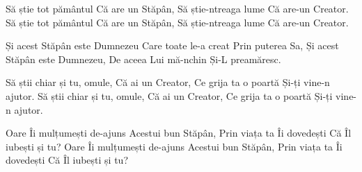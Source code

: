 \beginverse
Să știe tot pământul
Că are un Stăpân,
Să știe-ntreaga lume
Că are-un Creator.
Să știe tot pământul
Că are un Stăpân,
Să știe-ntreaga lume
Că are-un Creator.
\endverse

\beginchorus
Și acest Stăpân este Dumnezeu
Care toate le-a creat
Prin puterea Sa,
Și acest Stăpân este Dumnezeu,
De aceea Lui mă-nchin
Și-L preamăresc.
\endchorus

\beginverse
Să știi chiar și tu, omule,
Că ai un Creator,
Ce grija ta o poartă
Și-ți vine-n ajutor.
Să știi chiar și tu, omule,
Că ai un Creator,
Ce grija ta o poartă
Și-ți vine-n ajutor.
\endverse

\beginverse
Oare Îi mulțumești de-ajuns
Acestui bun Stăpân,
Prin viața ta Îi dovedești
Că Îl iubești și tu?
Oare Îi mulțumești de-ajuns
Acestui bun Stăpân,
Prin viața ta Îi dovedești
Că Îl iubești și tu?
\endverse
\endsong